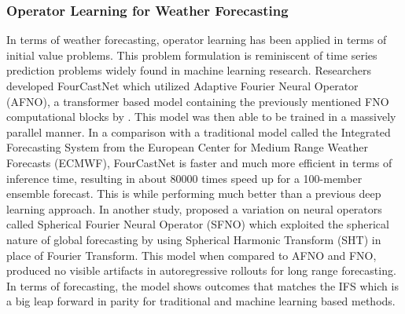 \subsubsection*{Operator Learning for Weather Forecasting}
In terms of weather forecasting, operator learning has been applied in terms of initial value problems. This problem formulation is reminiscent of time series prediction problems widely found in machine learning research. Researchers \textcite{kurthFourCastNetAcceleratingGlobal2023} developed FourCastNet which utilized Adaptive Fourier Neural Operator (AFNO), a transformer based model containing the previously mentioned FNO computational blocks by \textcite{li2021fourier}. This model was then able to be trained in a massively parallel manner. In a comparison with a traditional model called the Integrated Forecasting System from the European Center for Medium Range Weather Forecasts (ECMWF), FourCastNet is faster and much more efficient in terms of inference time, resulting in about \num{80000} times speed up for a \num{100}-member ensemble forecast. This is while performing much better than a previous deep learning approach. In another study, \textcite{bonevSphericalFourierNeural2023} proposed a variation on neural operators called Spherical Fourier Neural Operator (SFNO) which exploited the spherical nature of global forecasting by using Spherical Harmonic Transform (SHT) in place of Fourier Transform. This model when compared to AFNO and FNO, produced no visible artifacts in autoregressive rollouts for long range forecasting. In terms of forecasting, the model shows outcomes that matches the IFS which is a big leap forward in parity for traditional and machine learning based methods.





